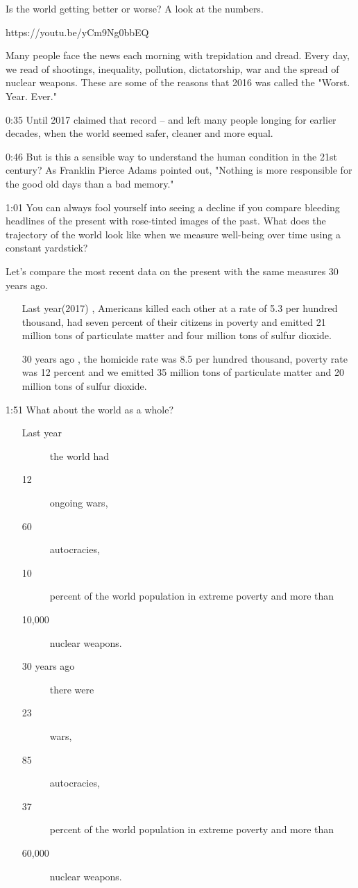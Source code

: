 \documentclass[10pt,titlepage]{article}
\begin{document}
Is the world getting better or worse? A look at the numbers.

https://youtu.be/yCm9Ng0bbEQ


Many people face the news each morning
with trepidation and dread.
Every day, we read of shootings,
inequality, pollution, dictatorship,
war and the spread of nuclear weapons.
These are some of the reasons
that 2016 was called the "Worst. Year. Ever."

0:35
Until 2017 claimed that record --
and left many people longing for earlier decades,
when the world seemed safer, cleaner and more equal.

0:46
But is this a sensible way to understand the human condition
in the 21st century?
As Franklin Pierce Adams pointed out,
"Nothing is more responsible for the good old days
than a bad memory."

1:01
You can always fool yourself into seeing a decline
if you compare bleeding headlines of the present
with rose-tinted images of the past.
What does the trajectory of the world look like
when we measure well-being over time using a constant yardstick?

Let's compare the most recent data on the present
with the same measures 30 years ago.
\begin{itemize}
\item[Last year(2017)], Americans killed each other at a rate of 5.3 per hundred thousand,
had seven percent of their citizens in poverty
and emitted 21 million tons of particulate matter
and four million tons of sulfur dioxide.
\item[30 years ago], the homicide rate was 8.5 per hundred thousand,
poverty rate was 12 percent
and we emitted 35 million tons of particulate matter
and 20 million tons of sulfur dioxide.
\end{itemize}
1:51
What about the world as a whole?
\begin{itemize}
\item[Last year]
  \begin{description}
    \item[] the world had
    \item[12] ongoing wars,
\item[60] autocracies,
\item[10] percent of the world population in extreme poverty
  and more than
\item[10,000] nuclear weapons.
  \end{description}
\item[30 years ago]
  \begin{description}
  \item[]  there were
    \item[23] wars,
\item[85] autocracies,
\item[37] percent of the world population in extreme poverty
  and more than
\item[60,000] nuclear weapons.
   \end{description}
\end{itemize}
\end{document}

